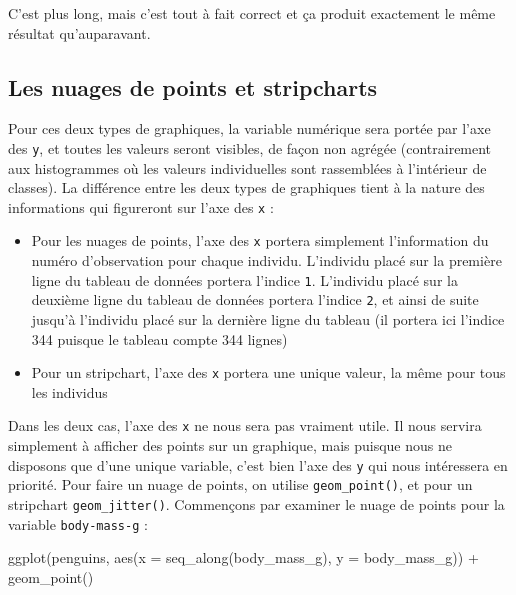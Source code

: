 \documentclass[
  letterpaper,
  DIV=11,
  numbers=noendperiod]{scrreprt}
\newenvironment{Shaded}{\begin{snugshade}}{\end{snugshade}}
\newcommand{\AttributeTok}[1]{\textcolor[rgb]{0.40,0.45,0.13}{#1}}
\newcommand{\FunctionTok}[1]{\textcolor[rgb]{0.28,0.35,0.67}{#1}}
\newcommand{\NormalTok}[1]{\textcolor[rgb]{0.00,0.23,0.31}{#1}}
\newcommand{\SpecialCharTok}[1]{\textcolor[rgb]{0.37,0.37,0.37}{#1}}
\providecommand{\tightlist}{%
  \setlength{\itemsep}{0pt}\setlength{\parskip}{0pt}}\usepackage{longtable,booktabs,array}
\begin{document}
C'est plus long, mais c'est tout à fait correct et ça produit exactement
le même résultat qu'auparavant.

\hypertarget{sec-cloud}{%
\subsection{Les nuages de points et stripcharts}\label{sec-cloud}}

Pour ces deux types de graphiques, la variable numérique sera portée par
l'axe des \texttt{y}, et toutes les valeurs seront visibles, de façon
non agrégée (contrairement aux histogrammes où les valeurs individuelles
sont rassemblées à l'intérieur de classes). La différence entre les deux
types de graphiques tient à la nature des informations qui figureront
sur l'axe des \texttt{x} :

\begin{itemize}
\tightlist
\item
  Pour les nuages de points, l'axe des \texttt{x} portera simplement
  l'information du numéro d'observation pour chaque individu. L'individu
  placé sur la première ligne du tableau de données portera l'indice
  \texttt{1}. L'individu placé sur la deuxième ligne du tableau de
  données portera l'indice \texttt{2}, et ainsi de suite jusqu'à
  l'individu placé sur la dernière ligne du tableau (il portera ici
  l'indice 344 puisque le tableau compte 344 lignes)
\item
  Pour un stripchart, l'axe des \texttt{x} portera une unique valeur, la
  même pour tous les individus
\end{itemize}

Dans les deux cas, l'axe des \texttt{x} ne nous sera pas vraiment utile.
Il nous servira simplement à afficher des points sur un graphique, mais
puisque nous ne disposons que d'une unique variable, c'est bien l'axe
des \texttt{y} qui nous intéressera en priorité. Pour faire un nuage de
points, on utilise \texttt{geom\_point()}, et pour un stripchart
\texttt{geom\_jitter()}. Commençons par examiner le nuage de points pour
la variable \texttt{body-mass-g} :

\begin{Shaded}
\begin{Highlighting}[]
\FunctionTok{ggplot}\NormalTok{(penguins, }\FunctionTok{aes}\NormalTok{(}\AttributeTok{x =} \FunctionTok{seq\_along}\NormalTok{(body\_mass\_g), }\AttributeTok{y =}\NormalTok{ body\_mass\_g)) }\SpecialCharTok{+}
  \FunctionTok{geom\_point}\NormalTok{()}
\end{Highlighting}
\end{Shaded}
\end{document}
